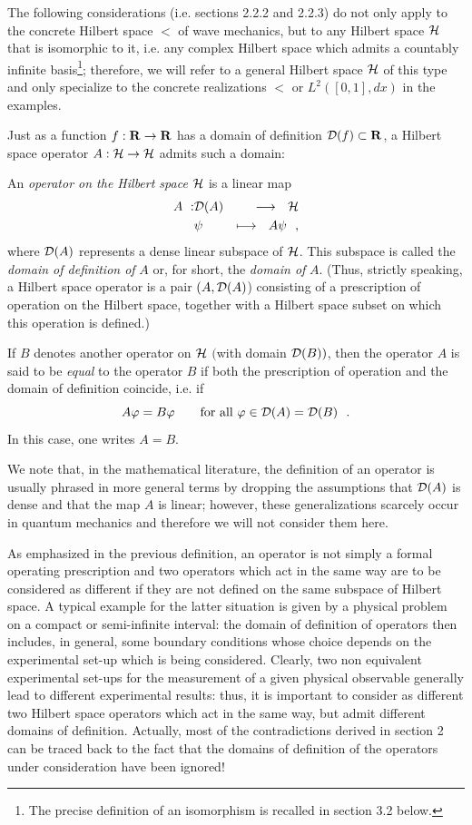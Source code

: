 \documentclass[12pt]{report}
\begin{document}
The following considerations (i.e. sections 2.2.2 and 2.2.3) 
do not only apply to 
the concrete Hilbert space $\lt$ of wave mechanics, but to any  
Hilbert space ${\cal H}$ that is isomorphic to it,
i.e. any complex Hilbert space which admits a countably
infinite basis\footnote{The precise definition of an 
isomorphism is recalled in section 3.2 below.}; 
therefore, we will refer to a general Hilbert space
${\cal H}$ of this type and only specialize to the 
concrete realizations $\lt$
or $L^2 ([0,1], dx)$ in the examples.  


Just as a function $f : {\bf R} \to {\bf R}$ 
has a domain of definition 
${\cal D}(f) \subset {\bf R}$,  
a Hilbert space operator $A : {\cal H} \to {\cal H}$ 
admits such a domain: 
\begin{defin}
An {\em operator on the Hilbert space ${\cal H}$} is a linear map 
\begin{eqnarray}
A \ : & {\cal D} (A) & \longrightarrow \ \ {\cal H}
\\
 & \psi  & \longmapsto \ \
A  \psi 
\ \ ,
\nonumber
\end{eqnarray}
 where ${\cal D}(A)$ represents a dense linear subspace of ${\cal H}$.
This subspace is called 
 the {\em  domain of definition of} $A$
or, for short, the {\em  domain of} $A$.  
(Thus, strictly speaking, a 
Hilbert space operator
is a pair $(A, {\cal D}(A)$) consisting of 
a prescription of operation on the Hilbert space, together with 
a Hilbert space subset on which this operation is 
defined.)
 
If $B$ denotes another operator on ${\cal H}$ 
$($with domain ${\cal D} (B))$, then the operator $A$ 
is said to be {\em equal} 
to the operator $B$ if both 
the prescription of operation and the domain
of definition coincide, i.e. if
\[
A \varphi =  B \varphi 
\qquad \mbox{for all} \ \varphi \in {\cal D} (A) = {\cal D} (B)
\ \ . 
\]
In this case, one writes $A=B$. 
\end{defin}
We note that, in the mathematical literature,
the definition of an operator 
is usually phrased in more general terms 
by dropping the 
assumptions that ${\cal D} (A)$ is dense and that the map $A$
is linear; however, these generalizations scarcely occur 
in quantum mechanics and therefore we will not consider them here. 

As emphasized in the previous definition, 
an operator is not simply a formal operating 
prescription and two operators
which act in the same way are to be considered 
as different if they
are not defined on the same subspace of Hilbert space.
A typical example for the latter situation is given by  
a physical problem on a compact or semi-infinite interval: the 
domain of definition of operators then includes, in general,
some boundary conditions whose choice 
depends on the experimental set-up which 
is being considered. 
Clearly, two non equivalent experimental set-ups 
for the measurement of a given physical observable 
generally lead to different experimental results:
thus, it is important to consider as different
two Hilbert space operators which act in the same way,
but admit different domains of definition.
Actually, most of the contradictions derived 
in section  2 can be traced back to the 
fact that the domains of definition
of the operators
under consideration have been ignored!
\end{document}
